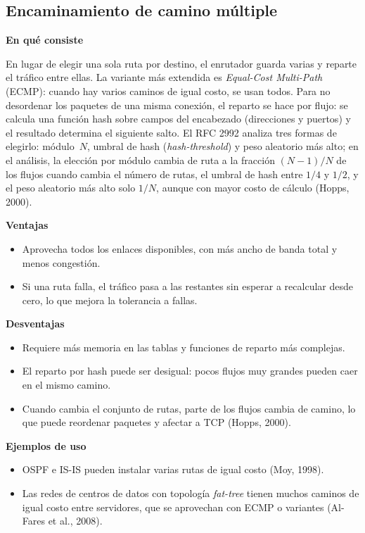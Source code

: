 \documentclass[12pt,letterpaper]{article}
\newcommand{\rub}[1]{\par\medskip\noindent\textbf{#1}\par\nopagebreak}
\begin{document}
\subsection{Encaminamiento de camino múltiple}
\rub{En qué consiste}
En lugar de elegir una sola ruta por destino, el enrutador guarda varias y reparte el tráfico entre ellas. La variante más extendida es \emph{Equal-Cost Multi-Path} (ECMP): cuando hay varios caminos de igual costo, se usan todos. Para no desordenar los paquetes de una misma conexión, el reparto se hace por flujo: se calcula una función hash sobre campos del encabezado (direcciones y puertos) y el resultado determina el siguiente salto. El RFC 2992 analiza tres formas de elegirlo: módulo~$N$, umbral de hash (\emph{hash-threshold}) y peso aleatorio más alto; en el análisis, la elección por módulo cambia de ruta a la fracción $(N-1)/N$ de los flujos cuando cambia el número de rutas, el umbral de hash entre $1/4$ y $1/2$, y el peso aleatorio más alto solo $1/N$, aunque con mayor costo de cálculo (Hopps, 2000).
\rub{Ventajas}
\begin{itemize}[itemsep=2pt]
\item Aprovecha todos los enlaces disponibles, con más ancho de banda total y menos congestión.
\item Si una ruta falla, el tráfico pasa a las restantes sin esperar a recalcular desde cero, lo que mejora la tolerancia a fallas.
\end{itemize}
\rub{Desventajas}
\begin{itemize}[itemsep=2pt]
\item Requiere más memoria en las tablas y funciones de reparto más complejas.
\item El reparto por hash puede ser desigual: pocos flujos muy grandes pueden caer en el mismo camino.
\item Cuando cambia el conjunto de rutas, parte de los flujos cambia de camino, lo que puede reordenar paquetes y afectar a TCP (Hopps, 2000).
\end{itemize}
\rub{Ejemplos de uso}
\begin{itemize}[itemsep=2pt]
\item OSPF e IS-IS pueden instalar varias rutas de igual costo (Moy, 1998).
\item Las redes de centros de datos con topología \emph{fat-tree} tienen muchos caminos de igual costo entre servidores, que se aprovechan con ECMP o variantes (Al-Fares et al., 2008).
\end{itemize}
\end{document}
